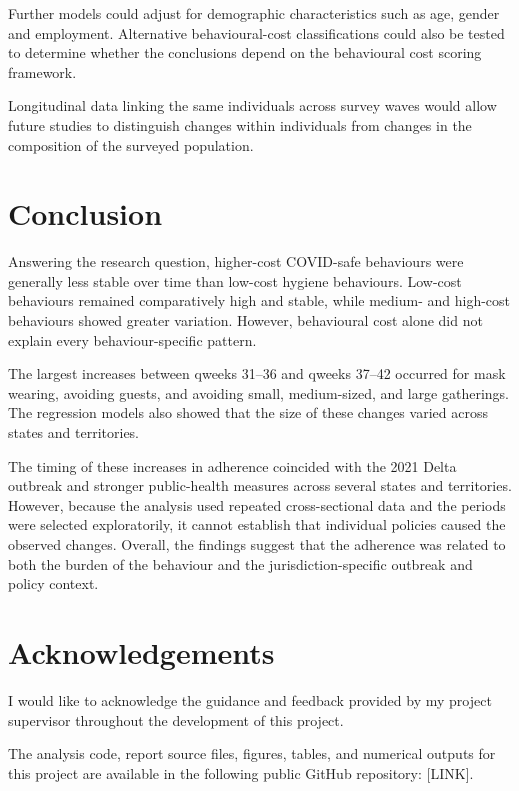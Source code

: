 \documentclass[
  12pt,
  a4paper,
]{article}
\begin{document}
Further models could adjust for demographic characteristics such as age,
gender and employment. Alternative behavioural-cost classifications could also be tested to determine whether the conclusions depend on the behavioural cost scoring framework.

Longitudinal data linking the same individuals across survey waves would
allow future studies to distinguish changes within individuals from
changes in the composition of the surveyed population.

\section{Conclusion}\label{conclusion}

Answering the research question, higher-cost COVID-safe
behaviours were generally less stable over time than low-cost hygiene
behaviours. Low-cost behaviours remained comparatively high and stable,
while medium- and high-cost behaviours showed greater variation.
However, behavioural cost alone did not explain every behaviour-specific
pattern.

The largest increases between qweeks 31--36 and qweeks 37--42 occurred
for mask wearing, avoiding guests, and avoiding small, medium-sized, and
large gatherings. The regression models also showed that the size of
these changes varied across states and territories.

The timing of these increases in adherence coincided with the 2021 Delta
outbreak and stronger public-health measures across several states and
territories. However, because the analysis used repeated cross-sectional
data and the periods were selected exploratorily, it cannot establish
that individual policies caused the observed changes. Overall, the
findings suggest that the adherence was related to both the burden of the
behaviour and the jurisdiction-specific outbreak and policy context.

\clearpage

\section{Acknowledgements}\label{acknowledgements}

I would like to acknowledge the guidance and feedback provided by my
project supervisor throughout the development of this project.

The analysis code, report source files, figures, tables, and numerical
outputs for this project are available in the following public GitHub
repository: {[}LINK{]}.
\end{document}
